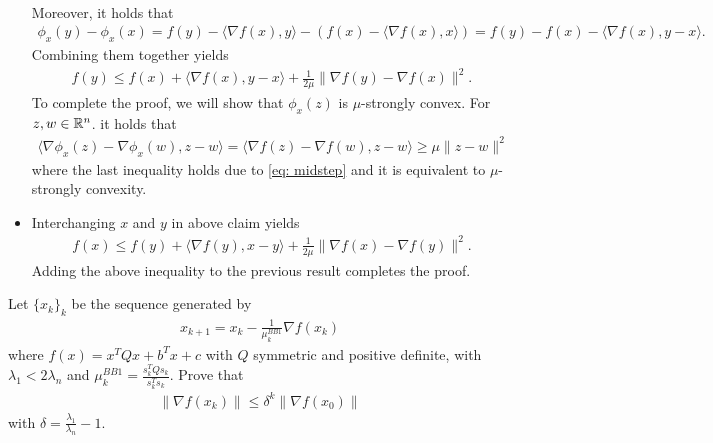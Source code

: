 \documentclass{ExerciseSheet}
\newif\ifsolutions
\begin{document}
\begin{solution}
\begin{itemize}
\begin{align*}
    \end{align*}
    Moreover, it holds that
    \begin{align*}
         \phi_x(y) - \phi_x(x) = f(y)-\langle \nabla f(x),y\rangle - \left(f(x)-\langle \nabla f(x),x\rangle\right) = f(y)-f(x)-\langle \nabla f(x),y-x\rangle.
    \end{align*}
    Combining them together yields
    \begin{align*}
        f(y)\leq f(x)+\langle \nabla f(x), y-x\rangle +\frac{1}{2\mu}\lVert  \nabla f(y)- \nabla f(x)\rVert^2.
    \end{align*}
    To complete the proof, we will show that $\phi_x(z)$ is $\mu$-strongly convex. For $z, w \in \mathbb{R}^n$. it holds that
    \begin{align*}
        \langle \nabla \phi_x(z)-\nabla \phi_x(w),z-w \rangle = \langle \nabla f(z)-\nabla f(w),z-w \rangle \geq \mu \lVert z-w \rVert^2
    \end{align*}
    where the last inequality holds due to \eqref{eq: midstep} and it is equivalent to $\mu$-strongly convexity.
    \item Interchanging $x$ and $y$ in above claim yields
    \begin{align*}
        f(x)\leq f(y)+\langle \nabla f(y), x-y\rangle +\frac{1}{2\mu}\lVert  \nabla f(x)- \nabla f(y)\rVert^2.
    \end{align*}
    Adding the above inequality to the previous result completes the proof.
\end{itemize}
\end{solution}

\fi

\vskip 0.5cm
\begin{problem}[Proposition 8.2]
    Let $\{x_k\}_k$ be the sequence generated by 
    \begin{align*}
        x_{k+1}=x_k-\frac{1}{\mu_k^{BB1}} \nabla f(x_k)
    \end{align*}
    where $f(x) = x^TQx+b^Tx+c$ with $Q$ symmetric and positive definite, with $\lambda_1<2\lambda_n$ and $\mu_k^{BB1} = \frac{s_k^TQs_k}{s_k^Ts_k}$.
    Prove that
    \begin{align*}
        \lVert \nabla f(x_k)\rVert \leq \delta^k\lVert \nabla f(x_0)\rVert
    \end{align*}
    with $\delta = \frac{\lambda_1}{\lambda_n}-1$.
\end{problem}
\ifsolutions
\vskip 0.3cm
\end{document}
